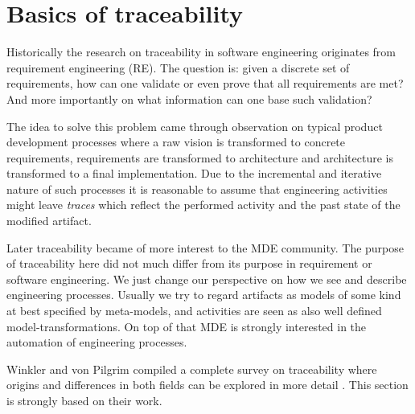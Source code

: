 \section{Basics of traceability}\label{sec:BasicsOfTraceability}
Historically the research on traceability in software engineering originates from requirement engineering (RE). 
The question is: given a discrete set of requirements, how can one validate or even prove that all requirements are met? 
And more importantly on what information can one base such validation? 

The idea to solve this problem came through observation on typical product development processes where a raw vision is transformed to concrete requirements, requirements are transformed to architecture and architecture is transformed to a final implementation. 
Due to the incremental and iterative nature of such processes it is reasonable to assume that engineering activities might leave \textit{traces} which reflect the performed activity and the past state of the modified artifact.

Later traceability became of more interest to the MDE community. 
The purpose of traceability here did not much differ from its purpose in requirement or software engineering. 
We just change our perspective on how we see and describe engineering processes. 
Usually we try to regard artifacts as models of some kind at best specified by meta-models, and activities are seen as also well defined model-transformations. 
On top of that MDE is strongly interested in the automation of engineering processes.

Winkler and von Pilgrim compiled a complete survey on traceability where origins and differences in both fields can be explored in more detail \cite{TraceabilitySurvey}. 
This section is strongly based on their work.


